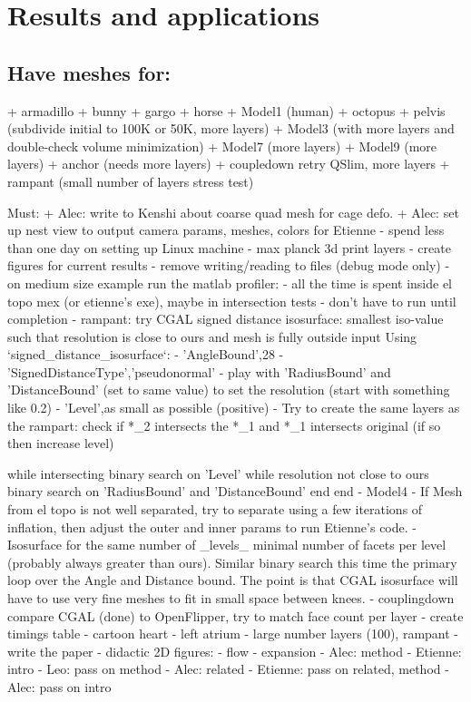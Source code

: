 
\section{Results and applications}
\label{sec:results}

\subsection{Have meshes for:}
  + armadillo
  + bunny
  + gargo
  + horse
  + Model1 (human)
  + octopus
  + pelvis (subdivide initial to 100K or 50K, more layers)
  + Model3 (with more layers and double-check volume minimization)
  + Model7 (more layers)
  + Model9 (more layers)
  + anchor (needs more layers)
  + coupledown retry QSlim, more layers
  + rampant (small number of layers stress test)

Must:
  + Alec: write to Kenshi about coarse quad mesh for cage defo.
  + Alec: set up nest view to output camera params, meshes, colors for Etienne
  - spend less than one day on setting up Linux machine
  - max planck 3d print layers
  - create figures for current results
  - remove writing/reading to files (debug mode only)
  - on medium size example run the matlab profiler:
    - all the time is spent inside el topo mex (or etienne's exe), maybe in
      intersection tests
    - don't have to run until completion
  - rampant: try CGAL signed distance isosurface: smallest iso-value such that
    resolution is close to ours and mesh is fully outside input
    Using `signed\_distance\_isosurface`:
    - 'AngleBound',28 
    - 'SignedDistanceType','pseudonormal'
    - play with 'RadiusBound' and 'DistanceBound' (set to same value) to set the
      resolution (start with something like 0.2)
    - 'Level',as small as possible (positive)
    - Try to create the same layers as the rampart: check if *\_2 intersects the
      *\_1 and *\_1 intersects original (if so then increase level)
  
    while intersecting
      binary search on 'Level'
      while resolution not close to ours
        binary search on 'RadiusBound' and 'DistanceBound'
      end
    end
  - Model4
    - If Mesh from el topo is not well separated, try to separate using a few
      iterations of inflation, then adjust the outer and inner params to run
      Etienne's code.
    - Isosurface for the same number of \_levels\_ minimal number of facets per
      level (probably always greater than ours). Similar binary search this
      time the primary loop over the Angle and Distance bound. The point is
      that CGAL isosurface will have to use very fine meshes to fit in small
      space between knees.
  - couplingdown compare CGAL (done) to OpenFlipper, try to match face count per
    layer
  - create timings table
  - cartoon heart 
  - left atrium
  - large number layers (100), rampant
  - write the paper
  - didactic 2D figures:
    - flow
    - expansion
  - Alec: method
  - Etienne: intro
  - Leo: pass on method
  - Alec: related
  - Etienne: pass on related, method
  - Alec: pass on intro

